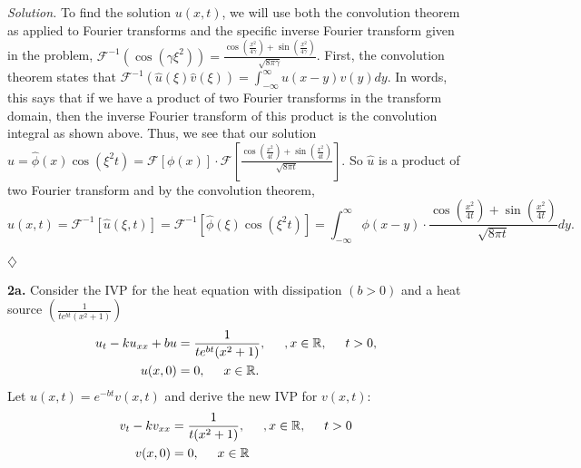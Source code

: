 \documentclass{article}
\begin{document}
\vspace{3mm}
\textit{Solution.} To find the solution \(u(x,t)\), we will use both the convolution theorem as applied to Fourier transforms and the specific inverse Fourier transform given in the problem, \(\mathcal{F}^{-1}(\cos(\gamma \xi^2)) = \frac{\cos (\frac{x^2}{4\gamma}) + \sin(\frac{x^2}{4\gamma}) }{\sqrt{8\pi \gamma}} \). First, the convolution theorem states that \( \mathcal{F}^{-1}(\hat u(\xi) \hat v(\xi)) = \int_{-\infty}^{\infty}u(x-y)v(y)dy \). In words, this says that if we have a product of two Fourier transforms in the transform domain, then the inverse Fourier transform of this product is the convolution integral as shown above. Thus, we see that our solution \(\hat u = \hat \phi(x) \cos(\xi^2 t) = \mathcal{F}[\phi(x)]\cdot\mathcal{F}[\frac{\cos (\frac{x^2}{4t}) + \sin(\frac{x^2}{4t}) }{\sqrt{8\pi t}} ]\). So \(\hat u\) is a product of two Fourier transform and by the convolution theorem, 
\[
u(x,t) = \mathcal{F}^{-1}[ \hat u(\xi,t) ]=  \mathcal{F}^{-1}[ \hat \phi(\xi)\cos(\xi^2 t)] =\int_{-\infty}^{\infty} \phi(x-y) \cdot \frac{\cos (\frac{x^2}{4t}) + \sin(\frac{x^2}{4t}) }{\sqrt{8\pi t}} dy.
\] \begin{flushright}
\( \diamondsuit \)
\end{flushright}











\newpage
\textbf{2a.} Consider the IVP for the heat equation with dissipation \((b>0)\) and a heat source \( (\frac{1}{te^{bt}(x^2+1)})\) 
\begin{align}
u_t - ku_{xx} + bu &= \frac{1}{te^{bt}(x^2+1)}, \hspace{5mm}, x\in\mathbb{R}, \hspace{5mm} t>0,\\
u(x,0) &=0, \hspace{5mm}x\in\mathbb{R}.
\end{align}
Let \(u(x,t) = e^{-bt}v(x,t)\) and derive the new IVP for \(v(x,t)\): 
\begin{align}
v_t -kv_{xx} &= \frac{1}{t(x^2+1)}, \hspace{5mm}, x\in\mathbb{R}, \hspace{5mm} t>0\\
v(x,0) &= 0, \hspace{5mm} x \in \mathbb{R} 
\end{align}
\end{document}
